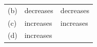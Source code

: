 \begin{enumerate}[noitemsep, label=\textbf{\arabic*}. ]
\begin{enumerate}[noitemsep, label=\textbf{\alph*}. ]
{\begin{center}
\begin{xtabular*}{\mytablewidth}[t]{|p{10\mystarwidth}|p{10\mystarwidth}|p{10\mystarwidth}|}
    
        (b) &
    
    
        decreases &
    
    
        decreases%
     \tabularnewline{}
    
    
        (c) &
    
    
        increases &
    
    
        increases%
     \tabularnewline{}
    
    
        (d) &
    
    
        increases &
    
    

\end{xtabular*}
\end{center}}
\end{enumerate}
\end{enumerate}
